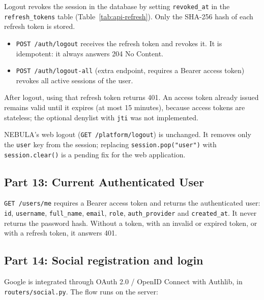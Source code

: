 \documentclass[9pt,a4paper,twocolumn]{article}
\begin{document}
Logout revokes the session in the database by setting \texttt{revoked\_at} in the \texttt{refresh\_tokens} table (Table~\ref{tab:api-refresh}). Only the SHA-256 hash of each refresh token is stored.

\begin{itemize}
    \item \texttt{POST /auth/logout} receives the refresh token and revokes it. It is idempotent: it always answers 204 No Content.
    \item \texttt{POST /auth/logout-all} (extra endpoint, requires a Bearer access token) revokes all active sessions of the user.
\end{itemize}

After logout, using that refresh token returns 401. An access token already issued remains valid until it expires (at most 15 minutes), because access tokens are stateless; the optional denylist with \texttt{jti} was not implemented.

NEBULA's web logout (\texttt{GET /platform/logout}) is unchanged. It removes only the \texttt{user} key from the session; replacing \texttt{session.pop("user")} with \texttt{session.clear()} is a pending fix for the web application.

\subsection{Part 13: Current Authenticated User}

\texttt{GET /users/me} requires a Bearer access token and returns the authenticated user: \texttt{id}, \texttt{username}, \texttt{full\_name}, \texttt{email}, \texttt{role}, \texttt{auth\_provider} and \texttt{created\_at}. It never returns the password hash. Without a token, with an invalid or expired token, or with a refresh token, it answers 401.

\subsection{Part 14: Social registration and login}

Google is integrated through OAuth 2.0 / OpenID Connect with Authlib, in \texttt{routers/social.py}. The flow runs on the server:
\end{document}
